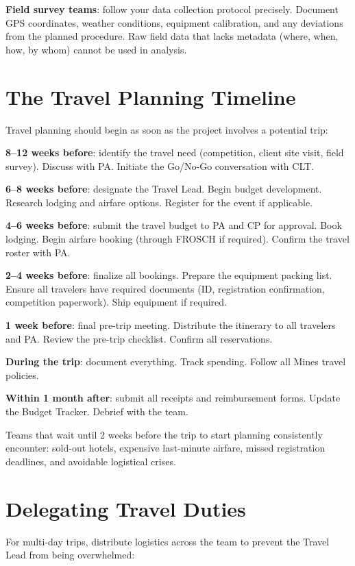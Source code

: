 \textbf{Field survey teams}: follow your data collection protocol precisely. Document GPS coordinates, weather conditions, equipment calibration, and any deviations from the planned procedure. Raw field data that lacks metadata (where, when, how, by whom) cannot be used in analysis.



\section{The Travel Planning Timeline}
Travel planning should begin as soon as the project involves a potential trip:

\textbf{8--12 weeks before}: identify the travel need (competition, client site visit, field survey). Discuss with PA. Initiate the Go/No-Go conversation with CLT.

\textbf{6--8 weeks before}: designate the Travel Lead. Begin budget development. Research lodging and airfare options. Register for the event if applicable.

\textbf{4--6 weeks before}: submit the travel budget to PA and CP for approval. Book lodging. Begin airfare booking (through FROSCH if required). Confirm the travel roster with PA.

\textbf{2--4 weeks before}: finalize all bookings. Prepare the equipment packing list. Ensure all travelers have required documents (ID, registration confirmation, competition paperwork). Ship equipment if required.

\textbf{1 week before}: final pre-trip meeting. Distribute the itinerary to all travelers and PA. Review the pre-trip checklist. Confirm all reservations.

\textbf{During the trip}: document everything. Track spending. Follow all Mines travel policies.

\textbf{Within 1 month after}: submit all receipts and reimbursement forms. Update the Budget Tracker. Debrief with the team.

Teams that wait until 2 weeks before the trip to start planning consistently encounter: sold-out hotels, expensive last-minute airfare, missed registration deadlines, and avoidable logistical crises.

\section{Delegating Travel Duties}
For multi-day trips, distribute logistics across the team to prevent the Travel Lead from being overwhelmed:

